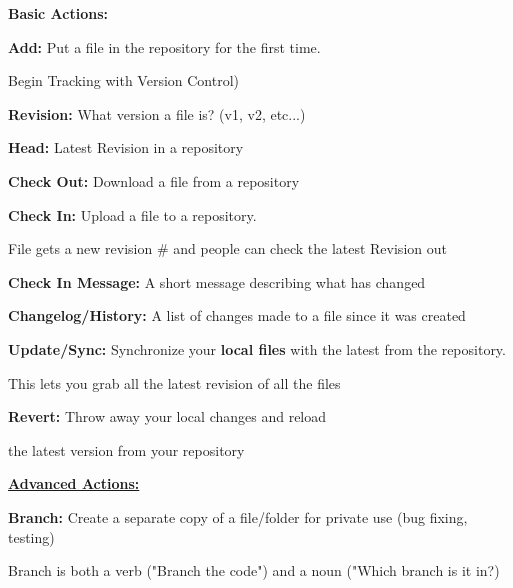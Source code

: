 \documentclass{article}
\begin{document}
\begin{flushleft}
\textbf{Basic Actions:} \\
\par

\textbf{Add:} Put a file in the repository for the first time. \par
Begin Tracking with Version Control) \\
\par

\textbf{Revision:} What version a file is? (v1, v2, etc...) \\
\par

\textbf{Head:} Latest Revision in a repository \\
\par

\textbf{Check Out:} Download a file from a repository \\
\par

\textbf{Check In:} Upload a file to a repository. \par
File gets a new revision # and people can check the latest Revision out \\
\par

\textbf{Check In Message:}  A short message describing what has changed \\
\par

\textbf{Changelog/History:} A list of changes made to a file since it was created \\
\par

\textbf{Update/Sync:} Synchronize your \textbf{local files} with the latest from the repository. \par
This lets you grab all the latest revision of all the files \\
\par

\textbf{Revert:} Throw away your local changes and reload \par
the latest version from your repository \\
\par

\textbf{\underline{Advanced Actions:}} \\
\par

\textbf{Branch:} Create a separate copy of a file/folder for private use (bug fixing, testing) \par
Branch is both a verb ("Branch the code") and a noun ("Which branch is it in?) \\
\par


\end{flushleft}
\end{document}
